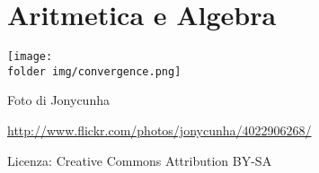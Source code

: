 \part{Aritmetica e Algebra}

\texttt{[image: \\folder img/convergence.png]}
 \begin{center}
 Foto di Jonycunha\par
 \url{http://www.flickr.com/photos/jonycunha/4022906268/}\par
 Licenza: Creative Commons Attribution BY-SA\par
 \end{center}
\clearpage
\cleardoublepage